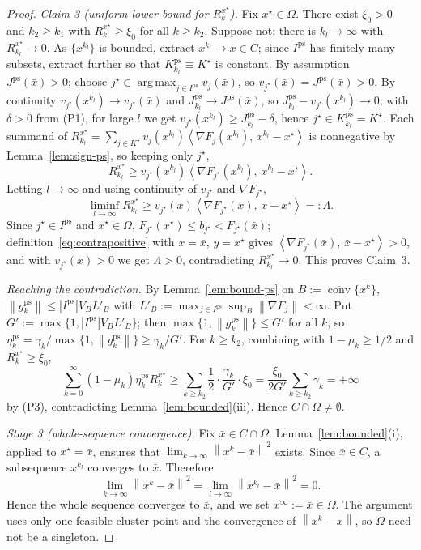 \documentclass[]{interact}
\theoremstyle{plain}
\theoremstyle{definition}
\theoremstyle{remark}
\newcommand{\norm}[1]{\left\lVert #1 \right\rVert}
\newcommand{\abs}[1]{\left\lvert #1 \right\rvert}
\newcommand{\inner}[2]{\left\langle #1,\, #2 \right\rangle}
\DeclareMathOperator*{\argmax}{arg\,max}
\DeclareMathOperator{\conv}{conv}
\newcommand{\ps}{\mathrm{ps}}
\begin{document}
\begin{proof}
\smallskip
\emph{Claim 3 (uniform lower bound for $R^{x^\star}_k$).} Fix $x^\star\in\Omega$. There exist $\xi_0>0$ and $k_2\ge k_1$ with $R^{x^\star}_k\ge\xi_0$ for all $k\ge k_2$. Suppose not: there is $k_l\to\infty$ with $R^{x^\star}_{k_l}\to0$. As $\{x^{k_l}\}$ is bounded, extract $x^{k_l}\to\bar x\in C$; since $I^{\ps}$ has finitely many subsets, extract further so that $K^{\ps}_{k_l}\equiv K^\star$ is constant. By assumption $J^{\ps}(\bar x)>0$; choose $j^\star\in\argmax_{j\in I^{\ps}}v_j(\bar x)$, so $v_{j^\star}(\bar x)=J^{\ps}(\bar x)>0$. By continuity $v_{j^\star}(x^{k_l})\to v_{j^\star}(\bar x)$ and $J^{\ps}_{k_l}\to J^{\ps}(\bar x)$, so $J^{\ps}_{k_l}-v_{j^\star}(x^{k_l})\to0$; with $\delta>0$ from (P1), for large $l$ we get $v_{j^\star}(x^{k_l})\ge J^{\ps}_{k_l}-\delta$, hence $j^\star\in K^{\ps}_{k_l}=K^\star$. Each summand of $R^{x^\star}_{k_l}=\sum_{j\in K^\star}v_j(x^{k_l})\inner{\nabla F_j(x^{k_l})}{x^{k_l}-x^\star}$ is nonnegative by Lemma~\ref{lem:sign-ps}, so keeping only $j^\star$,
\[
R^{x^\star}_{k_l}\ge v_{j^\star}(x^{k_l})\inner{\nabla F_{j^\star}(x^{k_l})}{x^{k_l}-x^\star}.
\]
Letting $l\to\infty$ and using continuity of $v_{j^\star}$ and $\nabla F_{j^\star}$,
\[
\liminf_{l\to\infty}R^{x^\star}_{k_l}\ge v_{j^\star}(\bar x)\inner{\nabla F_{j^\star}(\bar x)}{\bar x-x^\star}=:\Lambda .
\]
Since $j^\star\in I^{\ps}$ and $x^\star\in\Omega$, $F_{j^\star}(x^\star)\le b_{j^\star}<F_{j^\star}(\bar x)$; definition~\eqref{eq:contrapositive} with $x=\bar x$, $y=x^\star$ gives $\inner{\nabla F_{j^\star}(\bar x)}{\bar x-x^\star}>0$, and with $v_{j^\star}(\bar x)>0$ we get $\Lambda>0$, contradicting $R^{x^\star}_{k_l}\to0$. This proves Claim~3.

\smallskip
\emph{Reaching the contradiction.} By Lemma~\ref{lem:bound-ps} on $B:=\overline{\conv}\{x^k\}$, $\norm{g^{\ps}_k}\le\abs{I^{\ps}}V_B L'_B$ with $L'_B:=\max_{j\in I^{\ps}}\sup_B\norm{\nabla F_j}<\infty$. Put $G':=\max\{1,\abs{I^{\ps}}V_B L'_B\}$; then $\max\{1,\norm{g^{\ps}_k}\}\le G'$ for all $k$, so $\eta^{\ps}_k=\gamma_k/\max\{1,\norm{g^{\ps}_k}\}\ge\gamma_k/G'$. For $k\ge k_2$, combining with $1-\mu_k\ge1/2$ and $R^{x^\star}_k\ge\xi_0$,
\[
\sum_{k=0}^\infty(1-\mu_k)\eta^{\ps}_k R^{x^\star}_k\ge\sum_{k\ge k_2}\frac12\cdot\frac{\gamma_k}{G'}\cdot\xi_0=\frac{\xi_0}{2G'}\sum_{k\ge k_2}\gamma_k=+\infty
\]
by (P3), contradicting Lemma~\ref{lem:bounded}(iii). Hence $C\cap\Omega\ne\emptyset$.

\emph{Stage 3 (whole-sequence convergence).} Fix $\bar x\in C\cap\Omega$. Lemma~\ref{lem:bounded}(i), applied to $x^\star=\bar x$, ensures that $\lim_{k\to\infty}\norm{x^k-\bar x}^2$ exists. Since $\bar x\in C$, a subsequence $x^{k_l}$ converges to $\bar x$. Therefore
\[
\lim_{k\to\infty}\norm{x^k-\bar x}^2
=\lim_{l\to\infty}\norm{x^{k_l}-\bar x}^2=0.
\]
Hence the whole sequence converges to $\bar x$, and we set $x^\infty:=\bar x\in\Omega$. The argument uses only one feasible cluster point and the convergence of $\norm{x^k-\bar x}$, so $\Omega$ need not be a singleton.
\end{proof}
\end{document}
